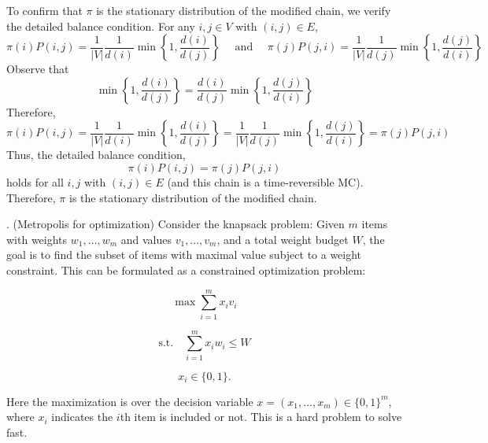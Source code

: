 \documentclass{article}
\begin{document}
{\medskip
To confirm that \(\pi\) is the stationary distribution of the modified chain, we verify the detailed balance condition. For any \( i,j \in V \) with \( (i,j) \in E \),
\[
    \pi(i) P(i,j) = \frac{1}{|V|} \frac{1}{d(i)} \min\left\{ 1, \frac{d(i)}{d(j)} \right\} \quad \text{ and } \quad
\pi(j) P(j,i) = \frac{1}{|V|} \frac{1}{d(j)} \min\left\{ 1, \frac{d(j)}{d(i)} \right\}
\]
Observe that
\[
\min\left\{ 1, \frac{d(i)}{d(j)} \right\} = \frac{d(i)}{d(j)} \min\left\{ 1, \frac{d(j)}{d(i)} \right\}
\]
Therefore,
\[
\pi(i) P(i,j) = \frac{1}{|V|} \frac{1}{d(i)} \min\left\{ 1, \frac{d(i)}{d(j)} \right\} 
= \frac{1}{|V|} \frac{1}{d(j)} \min\left\{ 1, \frac{d(j)}{d(i)} \right\} 
= \pi(j) P(j,i)
\]
Thus, the detailed balance condition,
\[
\pi(i)P(i,j) = \pi(j)P(j,i)
\]
holds for all \( i,j \) with \( (i,j) \in E \) (and this chain is a time-reversible MC). Therefore, \(\pi\) is the stationary distribution of the modified chain.
}

. (Metropolis for optimization) Consider the knapsack problem: Given $m$ items with weights $w_1, \dots, w_m$ and values $v_1, \dots, v_m$, and a total weight budget $W$, the goal is to find the subset of items with maximal value subject to a weight constraint. This can be formulated as a constrained optimization problem:

\[
\max \sum_{i=1}^{m} x_i v_i
\]

\[
\text{s.t.} \quad \sum_{i=1}^{m} x_i w_i \leq W
\]

\[
x_i \in \{0,1\}.
\]

Here the maximization is over the decision variable $x = (x_1, \dots, x_m) \in \{0,1\}^m$, where $x_i$ indicates the $i$th item is included or not. This is a hard problem to solve fast.
\end{document}
